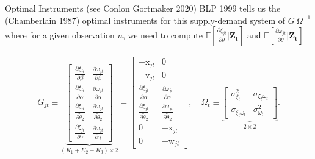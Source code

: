 \begin{frame}{Optimal Instruments (see Conlon Gortmaker 2020)}
\noindent BLP 1999 tells us the (Chamberlain 1987) optimal instruments for this supply-demand system of $G\, \Omega^{-1}$ where for a given observation $n$, we need to compute $\mathbb{E}[\frac{\partial \xi_{jt}}{\partial \theta} | \mathbf{Z_t}]$ and $\mathbb{E}[\frac{\partial \omega_{jt}}{\partial \theta} | \mathbf{Z_t}]$

\begin{align*}
    G_{jt} \equiv \underbrace{
        \begin{bmatrix}
            \frac{\partial \xi_{jt}}{\partial \beta}
            & \frac{\partial \omega_{jt}}{\partial \beta} \\
            \frac{\partial \xi_{jt}}{\partial \alpha}
            & \frac{\partial \omega_{jt}}{\partial \alpha} \\
            \frac{\partial \xi_{jt}}{\partial \widetilde{\theta}_2}
            & \frac{\partial \omega_{jt}}{\partial \widetilde{\theta}_2} \\
            \frac{\partial \xi_{jt}}{\partial \gamma} 
            & \frac{\partial \omega_{jt}}{\partial \gamma} 
        \end{bmatrix}
    }_{(K_1 + K_2 + K_3)\times 2}
    = 
    \begin{bmatrix}
        -\mathrm{x}_{jt} & 0 \\
        -\mathrm{v}_{jt} & 0 \\
        \frac{\partial \xi_{jt}}{\partial \alpha}  
        &  \frac{\partial \omega_{jt}}{\partial \alpha}\\
        \frac{\partial \xi_{jt}}{\partial \widetilde{\theta}_2} 
        & \frac{\partial \omega_{jt}}{\partial \widetilde{\theta}_2} \\
        0 & -\mathrm{x}_{jt} \\
        0 & -\mathrm{w}_{jt}
    \end{bmatrix}
    , \quad \Omega_t \equiv 
    \underbrace{
        \begin{bmatrix}
        \sigma^2_{\xi_t} & \sigma_{\xi_t \omega_t}\\
        \sigma_{\xi_t \omega_t} & \sigma^2_{\omega_t}
    \end{bmatrix}
    }_{2 \times 2}.
\end{align*}
\end{frame}


